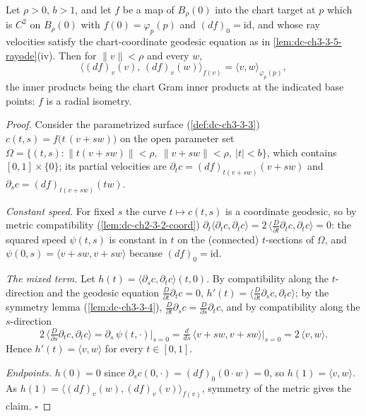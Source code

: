 \begin{lemma}
  \label{lem:dc-ch3-3-5-surface}
  \leanok
  Let $\rho > 0$, $b > 1$, and let $f$ be a map of $B_\rho(0)$ into the chart
  target at $p$ which is $C^2$ on $B_\rho(0)$ with $f(0) = \varphi_p(p)$ and
  $(df)_0 = \mathrm{id}$, and whose ray velocities satisfy the
  chart-coordinate geodesic equation as in \cref{lem:dc-ch3-3-5-rayode}(iv).
  Then for $\|v\| < \rho$ and every $w$,
  $$\big\langle (df)_v(v),\, (df)_v(w) \big\rangle_{f(v)}
    = \langle v, w\rangle_{\varphi_p(p)},$$
  the inner products being the chart Gram inner products at the indicated
  base points: $f$ is a radial isometry.
\end{lemma}
\begin{proof}
  \leanok
  Consider the parametrized surface (\cref{def:dc-ch3-3-3})
  $c(t,s) = f\big(t\,(v + s w)\big)$ on the open parameter set
  $\Omega = \{(t,s) : \|t(v+sw)\| < \rho,\ \|v+sw\| < \rho,\ |t| < b\}$,
  which contains $[0,1] \times \{0\}$; its partial velocities are
  $\partial_t c = (df)_{t(v+sw)}(v+sw)$ and $\partial_s c = (df)_{t(v+sw)}(tw)$.

  \emph{Constant speed.} For fixed $s$ the curve $t \mapsto c(t,s)$ is a
  coordinate geodesic, so by metric compatibility
  (\cref{lem:dc-ch2-3-2-coord})
  $\partial_t \langle \partial_t c, \partial_t c\rangle
  = 2\,\langle \tfrac{D}{\partial t}\partial_t c, \partial_t c\rangle = 0$:
  the squared speed $\psi(t,s)$ is constant in $t$ on the (connected)
  $t$-sections of $\Omega$, and $\psi(0,s) = \langle v+sw, v+sw\rangle$
  because $(df)_0 = \mathrm{id}$.

  \emph{The mixed term.} Let
  $h(t) = \langle \partial_s c, \partial_t c\rangle(t,0)$. By compatibility
  along the $t$-direction and the geodesic equation
  $\tfrac{D}{\partial t}\partial_t c = 0$,
  $h'(t) = \langle \tfrac{D}{\partial t}\partial_s c, \partial_t c\rangle$;
  by the symmetry lemma (\cref{lem:dc-ch3-3-4}),
  $\tfrac{D}{\partial t}\partial_s c = \tfrac{D}{\partial s}\partial_t c$,
  and by compatibility along the $s$-direction
  $$2\,\big\langle \tfrac{D}{\partial s}\partial_t c, \partial_t c\big\rangle
    = \partial_s\, \psi(t, \cdot)\big|_{s=0}
    = \tfrac{d}{ds}\,\langle v+sw, v+sw\rangle\big|_{s=0}
    = 2\,\langle v, w\rangle.$$
  Hence $h'(t) = \langle v, w\rangle$ for every $t \in [0,1]$.

  \emph{Endpoints.} $h(0) = 0$ since
  $\partial_s c(0, \cdot) = (df)_0(0 \cdot w) = 0$, so
  $h(1) = \langle v, w\rangle$. As
  $h(1) = \langle (df)_v(w), (df)_v(v)\rangle_{f(v)}$, symmetry of the
  metric gives the claim. $\square$
\end{proof}

